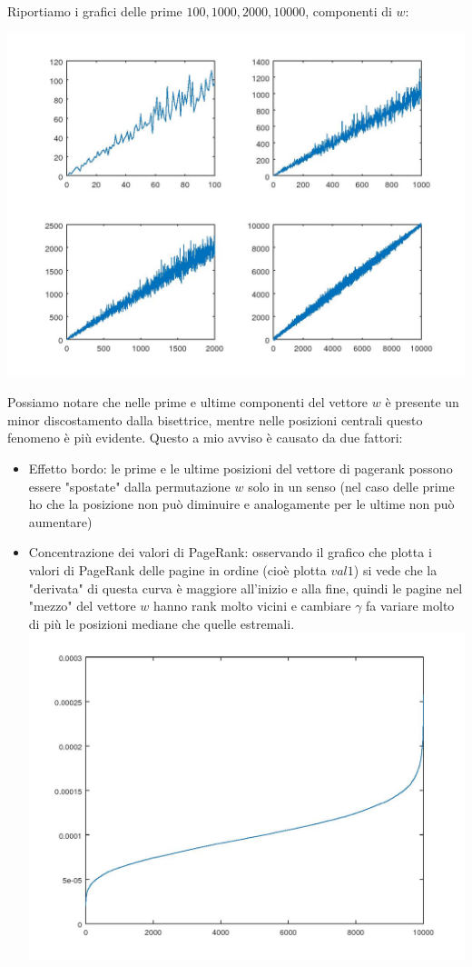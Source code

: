 \documentclass{article}
\begin{document}
	Riportiamo i grafici delle prime $100, 1000, 2000, 10000$,  componenti di $w$:
	
	\includegraphics[width=\textwidth]{grafico_es4.jpeg}
	
	Possiamo notare che nelle prime e ultime componenti del vettore $w$ è presente un minor discostamento dalla bisettrice, mentre nelle posizioni centrali questo fenomeno è più evidente. Questo a mio avviso è causato da due fattori:
	\begin{itemize}
		\item Effetto bordo: le prime e le ultime posizioni del vettore di pagerank possono essere "spostate" dalla permutazione $w$ solo in un senso (nel caso delle prime ho che la posizione non può diminuire e analogamente per le ultime non può aumentare)
		\item Concentrazione dei valori di PageRank: osservando il grafico che plotta i valori di PageRank delle pagine in ordine (cioè plotta $val1$) si vede che la "derivata" di questa curva è maggiore all'inizio e alla fine, quindi le pagine nel "mezzo" del vettore $w$ hanno rank molto vicini e cambiare $\gamma$ fa variare molto di più le posizioni mediane che quelle estremali. 
			\includegraphics[width=\textwidth]{grafico_es4,1.jpeg}
	\end{itemize}
\end{document}
